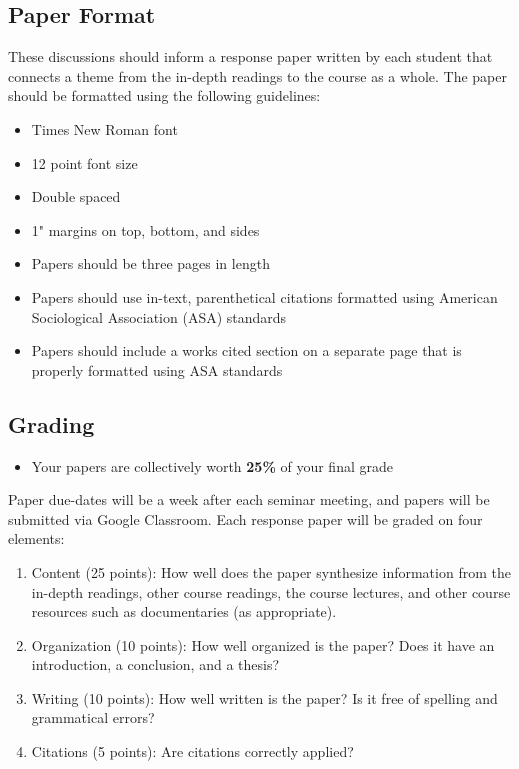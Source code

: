 \documentclass[]{book}
\providecommand{\tightlist}{%
  \setlength{\itemsep}{0pt}\setlength{\parskip}{0pt}}
\newenvironment{rmdblock}[1]
  {\begin{shaded*}
  \begin{itemize}
  \renewcommand{\labelitemi}{
    \raisebox{-.7\height}[0pt][0pt]{
      {\setkeys{Gin}{width=3em,keepaspectratio}\texttt{[image: images/\#1]}}
    }
  }
  \item
  }
  {
  \end{itemize}
  \end{shaded*}
  }
\newenvironment{rmdtip}
  {\begin{rmdblock}{tip}}
  {\end{rmdblock}}
\theoremstyle{definition}
\theoremstyle{definition}
\theoremstyle{definition}
\theoremstyle{remark}
\begin{document}
\hypertarget{paper-format}{%
\subsection{Paper Format}\label{paper-format}}

These discussions should inform a response paper written by each student
that connects a theme from the in-depth readings to the course as a
whole. The paper should be formatted using the following guidelines:

\begin{itemize}
\tightlist
\item
  Times New Roman font
\item
  12 point font size
\item
  Double spaced
\item
  1" margins on top, bottom, and sides
\item
  Papers should be three pages in length
\item
  Papers should use in-text, parenthetical citations formatted using
  American Sociological Association (ASA) standards
\item
  Papers should include a works cited section on a separate page that is
  properly formatted using ASA standards
\end{itemize}

\hypertarget{grading-1}{%
\subsection{Grading}\label{grading-1}}

\begin{rmdtip}
Your papers are collectively worth \textbf{25\%} of your final grade
\end{rmdtip}

Paper due-dates will be a week after each seminar meeting, and papers
will be submitted via Google Classroom. Each response paper will be
graded on four elements:

\begin{enumerate}
\def\labelenumi{\arabic{enumi}.}
\tightlist
\item
  Content (25 points): How well does the paper synthesize information
  from the in-depth readings, other course readings, the course
  lectures, and other course resources such as documentaries (as
  appropriate).
\item
  Organization (10 points): How well organized is the paper? Does it
  have an introduction, a conclusion, and a thesis?
\item
  Writing (10 points): How well written is the paper? Is it free of
  spelling and grammatical errors?
\item
  Citations (5 points): Are citations correctly applied?
\end{enumerate}
\end{document}
